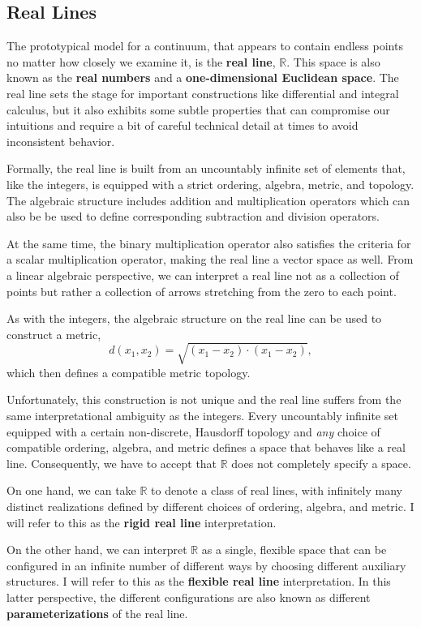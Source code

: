 \documentclass[
  letterpaper,
  DIV=11,
  numbers=noendperiod]{scrartcl}
\begin{document}
\subsection{Real Lines}\label{real-lines}

The prototypical model for a continuum, that appears to contain endless
points no matter how closely we examine it, is the \textbf{real line},
\(\mathbb{R}\). This space is also known as the \textbf{real numbers}
and a \textbf{one-dimensional Euclidean space}. The real line sets the
stage for important constructions like differential and integral
calculus, but it also exhibits some subtle properties that can
compromise our intuitions and require a bit of careful technical detail
at times to avoid inconsistent behavior.

Formally, the real line is built from an uncountably infinite set of
elements that, like the integers, is equipped with a strict ordering,
algebra, metric, and topology. The algebraic structure includes addition
and multiplication operators which can also be be used to define
corresponding subtraction and division operators.

At the same time, the binary multiplication operator also satisfies the
criteria for a scalar multiplication operator, making the real line a
vector space as well. From a linear algebraic perspective, we can
interpret a real line not as a collection of points but rather a
collection of arrows stretching from the zero to each point.

As with the integers, the algebraic structure on the real line can be
used to construct a metric, \[
d(x_{1}, x_{2}) = \sqrt{ (x_{1} - x_{2}) \cdot (x_{1} - x_{2}) },
\] which then defines a compatible metric topology.

Unfortunately, this construction is not unique and the real line suffers
from the same interpretational ambiguity as the integers. Every
uncountably infinite set equipped with a certain non-discrete, Hausdorff
topology and \emph{any} choice of compatible ordering, algebra, and
metric defines a space that behaves like a real line. Consequently, we
have to accept that \(\mathbb{R}\) does not completely specify a space.

On one hand, we can take \(\mathbb{R}\) to denote a class of real lines,
with infinitely many distinct realizations defined by different choices
of ordering, algebra, and metric. I will refer to this as the
\textbf{rigid real line} interpretation.

On the other hand, we can interpret \(\mathbb{R}\) as a single, flexible
space that can be configured in an infinite number of different ways by
choosing different auxiliary structures. I will refer to this as the
\textbf{flexible real line} interpretation. In this latter perspective,
the different configurations are also known as different
\textbf{parameterizations} of the real line.
\end{document}
